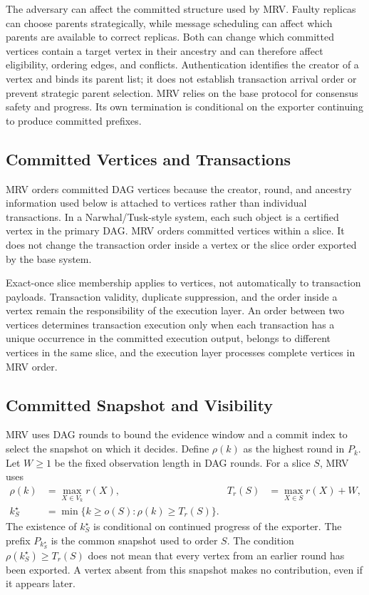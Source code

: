 The adversary can affect the committed structure used by MRV. Faulty replicas can choose parents strategically, while message scheduling can affect which parents are available to correct replicas. Both can change which committed vertices contain a target vertex in their ancestry and can therefore affect eligibility, ordering edges, and conflicts.
Authentication identifies the creator of a vertex and binds its parent list; it does not establish transaction arrival order or prevent strategic parent selection. MRV relies on the base protocol for consensus safety and progress. Its own termination is conditional on the exporter continuing to produce committed prefixes.

\subsection{Committed Vertices and Transactions}
\label{sec:vertex_transaction}

MRV orders committed DAG vertices because the creator, round, and ancestry information used below is attached to vertices rather than individual transactions. In a Narwhal/Tusk-style system, each such object is a certified vertex in the primary DAG. MRV orders committed vertices within a slice. It does not change the
transaction order inside a vertex or the slice order exported by the base system.

Exact-once slice membership applies to vertices, not automatically to transaction payloads. Transaction validity, duplicate suppression, and the order inside a vertex remain the responsibility of the execution layer. An order between two vertices determines transaction execution only when each transaction has a unique occurrence in the committed execution output, belongs to different vertices in the same slice, and the execution layer processes complete vertices in MRV order.

\subsection{Committed Snapshot and Visibility}
\label{sec:structural_evidence}

MRV uses DAG rounds to bound the evidence window and a commit index to select the snapshot on which it decides. Define $\rho(k)$ as the highest round in $P_k$. Let $W\geq1$ be the fixed observation length in DAG rounds. For a slice $S$, MRV uses
\[
\begin{aligned}
\rho(k) &= \max_{X\in V_k} r(X), &
T_r(S) &= \max_{X\in S} r(X)+W,\\
k^\star_S &=
\min\{k\geq o(S):\rho(k)\geq T_r(S)\}.
\end{aligned}
\]
The existence of $k^\star_S$ is conditional on continued progress of the exporter. The prefix $P_{k^\star_S}$ is the common snapshot used to order $S$.
The condition $\rho(k^\star_S)\geq T_r(S)$ does not mean that every vertex from an earlier round has been exported. A vertex absent from this snapshot makes no contribution, even if it appears later.

